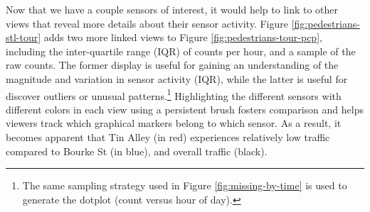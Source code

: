 \documentclass[12pt,]{article}
\let\rmarkdownfootnote\footnote%
\def\footnote{\protect\rmarkdownfootnote}
\theoremstyle{definition}
\theoremstyle{definition}
\theoremstyle{remark}
\begin{document}
Now that we have a couple sensors of interest, it would help to link to
other views that reveal more details about their sensor activity. Figure
\ref{fig:pedestrians-stl-tour} adds two more linked views to Figure
\ref{fig:pedestrians-tour-pcp}, including the inter-quartile range (IQR)
of counts per hour, and a sample of the raw counts. The former display
is useful for gaining an understanding of the magnitude and variation in
sensor activity (IQR), while the latter is useful for discover outliers
or unusual patterns.\footnote{The same sampling strategy used in Figure
  \ref{fig:missing-by-time} is used to generate the dotplot (count
  versus hour of day).} Highlighting the different sensors with
different colors in each view using a persistent brush fosters
comparison and helps viewers track which graphical markers belong to
which sensor. As a result, it becomes apparent that Tin Alley (in red)
experiences relatively low traffic compared to Bourke St (in blue), and
overall traffic (black).
\end{document}
